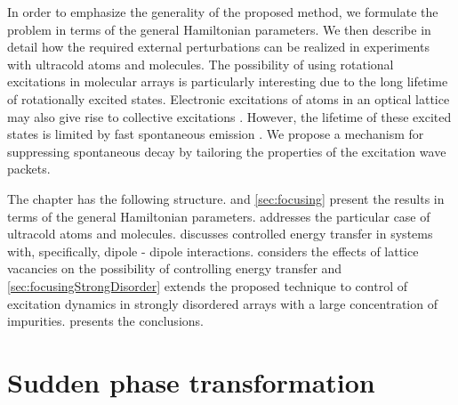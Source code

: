 In order to emphasize the generality of the proposed method, we formulate the 
problem in terms of the general Hamiltonian parameters. We then describe in detail how the required external 
perturbations can be realized in experiments with ultracold atoms and molecules. The possibility of using rotational 
excitations in molecular arrays is particularly interesting due to the long lifetime of rotationally excited states. 
Electronic excitations of atoms in an optical lattice may also give rise to collective excitations \cite{Zoubi1}. However, the 
lifetime of these excited states is limited by fast spontaneous emission \cite{electronic-exciton1, electronic-exciton2}. We propose a mechanism for 
suppressing spontaneous decay by tailoring the properties of the excitation wave packets. 


The chapter has the following structure.  and \autoref{sec:focusing} present the results in terms of the general 
Hamiltonian parameters.   addresses the particular case of ultracold atoms and molecules.
 discusses controlled energy transfer in systems with, specifically, 
dipole - dipole interactions.  considers the effects of lattice vacancies on the possibility of controlling 
energy transfer and \autoref{sec:focusingStrongDisorder} extends the proposed technique to
control of excitation dynamics in strongly disordered arrays with a large
concentration of impurities.  presents the conclusions.

\section{Sudden phase transformation}
\label{sec:phaseKicking}

